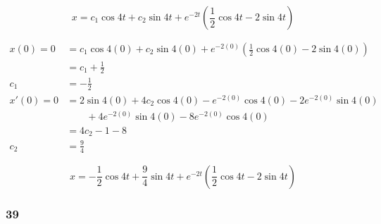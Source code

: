 \documentclass{article}
\begin{document}
\[x = c_1 \cos 4t + c_2 \sin 4t + e^{-2t} \left( \frac{1}{2} \cos 4t - 2 \sin 4t \right)\]

\begin{align*}
  x(0) = 0  & = c_1 \cos 4 (0) + c_2 \sin 4 (0) + e^{-2 (0)} \left( \frac{1}{2} \cos 4 (0) - 2 \sin 4 (0) \right) \\
            & = c_1 + \frac{1}{2}                                                                                 \\
  c_1       & = -\frac{1}{2}                                                                                      \\
  x'(0) = 0 & = 2 \sin 4 (0) + 4 c_2 \cos 4 (0) - e^{-2 (0)} \cos 4 (0) - 2 e^{-2 (0)} \sin 4 (0)                 \\
            & \qquad + 4 e^{-2 (0)} \sin 4 (0) - 8 e^{-2 (0)} \cos 4 (0)                                          \\
            & = 4 c_2 - 1 - 8                                                                                     \\
  c_2       & = \frac{9}{4}
\end{align*}

\[x = -\frac{1}{2} \cos 4t + \frac{9}{4} \sin 4t + e^{-2t} \left( \frac{1}{2} \cos 4t - 2 \sin 4t \right)\]

\subsubsection{39}
\end{document}
